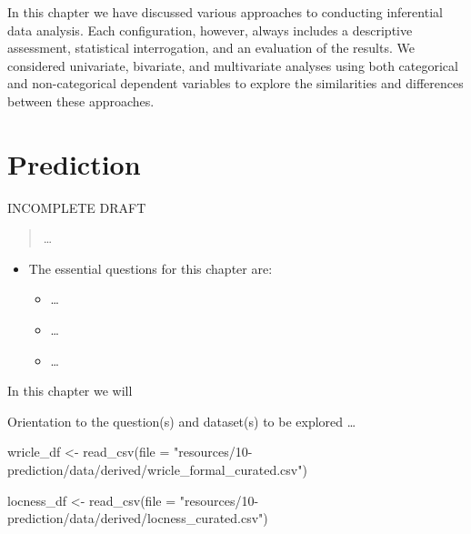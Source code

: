 \documentclass[
]{article}
\newenvironment{Shaded}{\begin{snugshade}}{\end{snugshade}}
\newcommand{\AttributeTok}[1]{\textcolor[rgb]{0.77,0.63,0.00}{#1}}
\newcommand{\FunctionTok}[1]{\textcolor[rgb]{0.00,0.00,0.00}{#1}}
\newcommand{\NormalTok}[1]{#1}
\newcommand{\OtherTok}[1]{\textcolor[rgb]{0.56,0.35,0.01}{#1}}
\newcommand{\StringTok}[1]{\textcolor[rgb]{0.31,0.60,0.02}{#1}}
\providecommand{\tightlist}{%
  \setlength{\itemsep}{0pt}\setlength{\parskip}{0pt}}
\newenvironment{rmdblock}[1]
  {\begin{shaded*}
  \begin{itemize}
  \renewcommand{\labelitemi}{
    \raisebox{-.5\height}[0pt][0pt]{
      {\setkeys{Gin}{width=2em,keepaspectratio}\texttt{[image: assets/images/\#1]}}
    }
  }
  \item
  }
  {
  \end{itemize}
  \end{shaded*}
  }
\newenvironment{rmdkey}
  {\begin{rmdblock}{key}}
  {\end{rmdblock}}
\begin{document}
In this chapter we have discussed various approaches to conducting inferential data analysis. Each configuration, however, always includes a descriptive assessment, statistical interrogation, and an evaluation of the results. We considered univariate, bivariate, and multivariate analyses using both categorical and non-categorical dependent variables to explore the similarities and differences between these approaches.

\hypertarget{prediction}{%
\section{Prediction}\label{prediction}}

INCOMPLETE DRAFT

\begin{quote}
\ldots{}
\end{quote}

\begin{rmdkey}
The essential questions for this chapter are:

\begin{itemize}
\tightlist
\item
  \ldots{}
\item
  \ldots{}
\item
  \ldots{}
\end{itemize}
\end{rmdkey}

In this chapter we will

Orientation to the question(s) and dataset(s) to be explored \ldots{}

\begin{Shaded}
\begin{Highlighting}[]
\NormalTok{wricle\_df }\OtherTok{\textless{}{-}} \FunctionTok{read\_csv}\NormalTok{(}\AttributeTok{file =} \StringTok{"resources/10{-}prediction/data/derived/wricle\_formal\_curated.csv"}\NormalTok{)}

\NormalTok{locness\_df }\OtherTok{\textless{}{-}} \FunctionTok{read\_csv}\NormalTok{(}\AttributeTok{file =} \StringTok{"resources/10{-}prediction/data/derived/locness\_curated.csv"}\NormalTok{)}
\end{Highlighting}
\end{Shaded}
\end{document}

